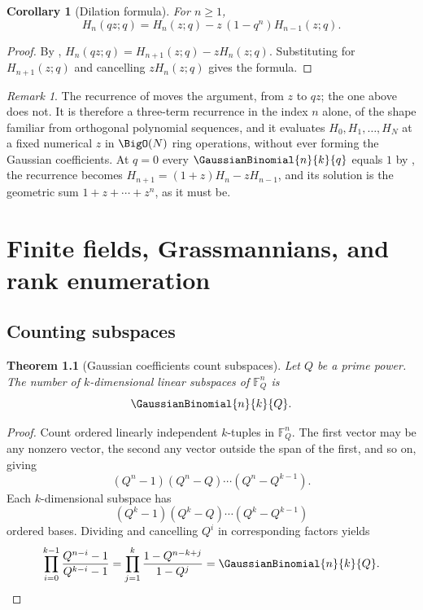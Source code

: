 \documentclass[11pt,a4paper,oneside,openany]{book}
\newtheorem{theorem}{Theorem}[chapter]
\newtheorem{corollary}[corollary]{Corollary}
\theoremstyle{definition}
\theoremstyle{remark}
\newtheorem{remark}[remark]{Remark}
\newcommand{\F}{\mathbb F}
\begin{document}
\begin{corollary}[Dilation formula]\label{cor:rogers-szego-dilation}
For $n\ge1$,
\[
 H_n(qz;q)=H_n(z;q)-z\,(1-q^n)H_{n-1}(z;q).
\]
\end{corollary}

\begin{proof}
By , $H_n(qz;q)=H_{n+1}(z;q)-zH_n(z;q)$.
Substituting  for $H_{n+1}(z;q)$ and
cancelling $zH_n(z;q)$ gives the formula.
\end{proof}

\begin{remark}\label{rem:rogers-szego-three-term}
The recurrence of  moves the argument, from
$z$ to $qz$; the one above does not.  It is therefore a three-term recurrence
in the index $n$ alone, of the shape familiar from orthogonal polynomial
sequences, and it evaluates $H_0,H_1,\ldots,H_N$ at a fixed numerical $z$ in
$\BigO(N)$ ring operations, without ever forming the Gaussian coefficients.  At
$q=0$ every $\GaussianBinomial{n}{k}{q}$ equals $1$ by ,
the recurrence becomes $H_{n+1}=(1+z)H_n-zH_{n-1}$, and its solution is the
geometric sum $1+z+\cdots+z^{n}$, as it must be.
\end{remark}

\chapter{Finite fields, Grassmannians, and rank enumeration}\label{chap:finite-geometry}

\section{Counting subspaces}

\begin{theorem}[Gaussian coefficients count subspaces]\label{thm:subspace-count}
Let $Q$ be a prime power.  The number of $k$-dimensional linear subspaces of $\F_Q^n$ is
\[
 \GaussianBinomial{n}{k}{Q}.
\]
\end{theorem}

\begin{proof}
Count ordered linearly independent $k$-tuples in $\F_Q^n$.  The first vector may be any nonzero vector, the second any vector outside the span of the first, and so on, giving
\[
 (Q^n-1)(Q^n-Q)\cdots(Q^n-Q^{k-1}).
\]
Each $k$-dimensional subspace has
\[
 (Q^k-1)(Q^k-Q)\cdots(Q^k-Q^{k-1})
\]
ordered bases.  Dividing and cancelling $Q^i$ in corresponding factors yields
\[
 \prod_{i=0}^{k-1}\frac{Q^{n-i}-1}{Q^{k-i}-1}
 =\prod_{j=1}^{k}\frac{1-Q^{n-k+j}}{1-Q^j}
 =\GaussianBinomial{n}{k}{Q}.
\]
\end{proof}
\end{document}
